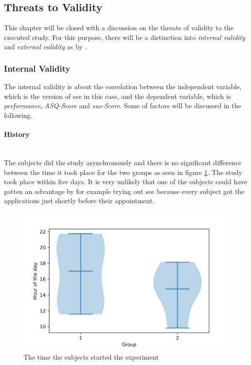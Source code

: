 \subsection{Threats to Validity}
\label{sec:validity}
This chapter will be closed with a discussion on the threats of validity to the executed study.
For this purpose, there will be a distinction into \textit{internal validity} and \textit{external validity} as by \cite{campbell2015experimental}.

\subsubsection{Internal Validity}
The internal validity is about the correlation between the independent variable, which is the version of \gls{see} in this case, and the dependent variable, which is \textit{performance}, \textit{\gls{ASQ}-Score} and \textit{\gls{sus}-Score}.
Some of \cite{campbell2015experimental} factors will be discussed in the following.

\paragraph{History}\mbox{}\\
The subjects did the study asynchronously and there is no significant difference between the time it took place for the two groups as seen in figure \ref{fig:date_violin}.
The study took place within five days. 
It is very unlikely that one of the subjects could have gotten an advantage by for example trying out \gls{see} because every subject got the applications just shortly before their appointment.

\begin{figure}[htb]
  \centering
  \includegraphics*[width=1\textwidth]{Evaluation/img/_violin_time.png}
  \caption{The time the subjects started the experiment}
  \label{fig:date_violin}
\end{figure}

